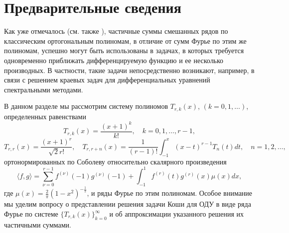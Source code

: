 \section{Предварительные сведения}

Как уже отмечалось (см. также \cite{Shar11, Shar12, Shar13, Shar14, Shar2006, Shar2008, Shar2003, Shar18}), частичные суммы смешанных рядов по классическим ортогональным полиномам, в отличие от сумм Фурье по этим же полиномам, успешно могут быть использованы в задачах, в которых требуется одновременно приближать дифференцируемую функцию и ее несколько производных. В частности, такие задачи непосредственно возникают, например, в связи с решением краевых задач для дифференциальных уравнений спектральными методами.

В данном разделе мы рассмотрим систему полиномов $T_{r,k}(x)$,  $(k=0,1,\ldots)$, определенных равенствами
\begin{equation}\label{du2018cheb-1.4}
T_{r,k}(x) =\frac{(x+1)^k}{k!}, \quad k=0,1,\ldots, r-1,
\end{equation}
\begin{equation}\label{du2018cheb-1.5}
T_{r,r}(x) =\frac{(x+1)^r}{\sqrt{2}r!},\quad T_{r,r+n}(x) =\frac{1}{(r-1)!}\int_{-1}^x(x-t)^{r-1}T_{n}(t)dt, \quad n=1,2,\ldots,
\end{equation}
ортонормированных по Соболеву относительно скалярного произведения
\begin{equation}\label{du2018cheb-1.3}
\langle f,g\rangle=\sum_{\nu=0}^{r-1}f^{(\nu)}(-1)g^{(\nu)}(-1)+\int_{-1}^{1}f^{(r)}(t)g^{(r)}(x)\mu(x)dx,
\end{equation}
где $\mu(x)=\frac2\pi(1-x^2)^{-\frac12}$, и ряды Фурье по этим полиномам. Особое внимание мы уделим вопросу о представлении  решения задачи Коши для ОДУ  в виде ряда Фурье по системе $\{T_{r,k}(x)\}_{k=0}^\infty$  и об аппроксимации указанного решения их частичными суммами.

